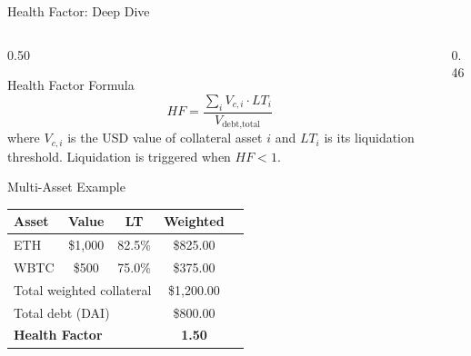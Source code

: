 \documentclass[8pt,aspectratio=169]{beamer}
\begin{document}
\begin{frame}{Health Factor: Deep Dive}
  \begin{columns}[T]
    \begin{column}{0.50\textwidth}
      \begin{block}{Health Factor Formula}
        \[
          HF = \frac{\displaystyle\sum_{i} V_{c,i} \cdot LT_i}{V_{\text{debt,total}}}
        \]
        where $V_{c,i}$ is the USD value of collateral asset $i$ and $LT_i$ is its liquidation threshold.
        Liquidation is triggered when $HF < 1$.
      \end{block}
      \vspace{3mm}
      \begin{block}{Multi-Asset Example}
        \footnotesize
        \begin{tabular}{lcccc}
          \toprule
          Asset & Value & LT & Weighted \\
          \midrule
          ETH  & \$1{,}000 & 82.5\% & \$825.00 \\
          WBTC & \$500   & 75.0\% & \$375.00 \\
          \midrule
          \multicolumn{3}{l}{Total weighted collateral} & \$1{,}200.00 \\
          \multicolumn{3}{l}{Total debt (DAI)} & \$800.00 \\
          \midrule
          \multicolumn{3}{l}{\textbf{Health Factor}} & \textbf{1.50} \\
          \bottomrule
        \end{tabular}
      \end{block}
    \end{column}
    \begin{column}{0.46\textwidth}
      \centering
\end{column}
\end{columns}
\end{frame}
\end{document}
